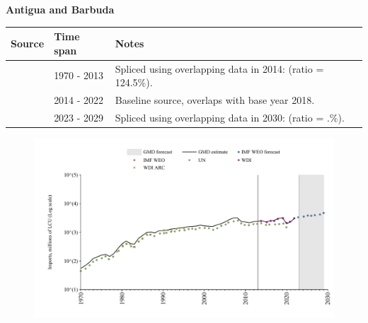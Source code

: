 \documentclass[12pt,a4paper,landscape]{article}
\begin{document}
\begin{adjustbox}{max totalsize={\paperwidth}{\paperheight},center}
\begin{minipage}[t][\textheight][t]{\textwidth}
\vspace*{0.5cm}
{}
\begin{center}
{\Large\bfseries Antigua and Barbuda}
\end{center}
\vspace{0.5cm}
\begin{table}[H]
\centering
\small
\begin{tabular}{|l|l|l|}
\hline
\textbf{Source} & \textbf{Time span} & \textbf{Notes} \\
\hline
\rowcolor{white}\cite{UN}& 1970 - 2013 &Spliced using overlapping data in 2014: (ratio = 124.5\%).\\
\rowcolor{lightgray}\cite{WDI}& 2014 - 2022 &Baseline source, overlaps with base year 2018.\\
\rowcolor{white}\cite{IMF_WEO_forecast}& 2023 - 2029 &Spliced using overlapping data in 2030: (ratio = .\%).\\
\hline
\end{tabular}
\end{table}
\begin{figure}[H]
\centering
\includegraphics[width=\textwidth,height=0.6\textheight,keepaspectratio]{graphs/ATG_imports.pdf}
\end{figure}
\end{minipage}
\end{adjustbox}
\end{document}
